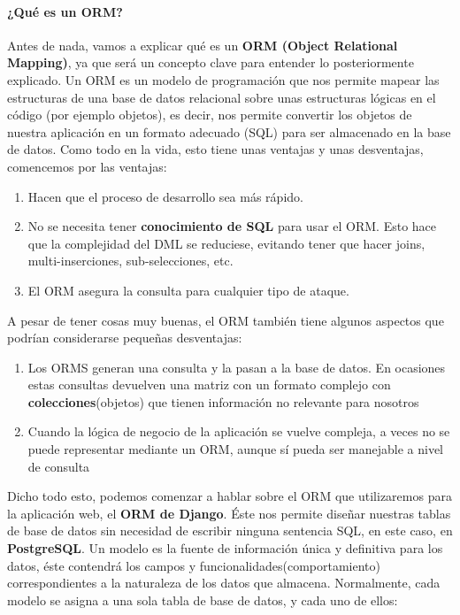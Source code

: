    \paragraph{¿Qué es un ORM?} \underline{}                                            
    \newline Antes de nada, vamos a explicar qué es un \textbf{ORM (Object Relational Mapping)}, ya
    que será un concepto clave para entender lo posteriormente explicado. Un ORM es un modelo
    de programación que nos permite mapear las estructuras de una base de datos relacional
    sobre unas estructuras lógicas en el código (por ejemplo objetos), es decir, nos permite
    convertir los objetos de nuestra aplicación en un formato adecuado (SQL) para ser
    almacenado en la base de datos. Como todo en la vida, esto tiene unas ventajas y unas
    desventajas, comencemos por las ventajas:

        \begin{enumerate}
            \item Hacen que el proceso de desarrollo sea más rápido.
            \item No se necesita tener \textbf{conocimiento de SQL } para usar el ORM. Esto
            hace que la complejidad del DML se reduciese, evitando tener que hacer joins,
            multi-inserciones, sub-selecciones, etc.
            \item El ORM asegura la consulta para cualquier tipo de ataque.
        \end{enumerate}

    A pesar de tener cosas muy buenas, el ORM también tiene algunos aspectos que podrían
    considerarse pequeñas desventajas:

        \begin{enumerate}
            \item Los ORMS generan una consulta y la pasan a la base de datos. En ocasiones
            estas consultas devuelven una matriz con un formato complejo con
            \textbf{colecciones}(objetos) que tienen información no relevante para nosotros
            \item Cuando la lógica de negocio de la aplicación se vuelve compleja, a veces
            no se puede representar mediante un ORM, aunque sí pueda ser manejable a nivel
            de consulta
        \end{enumerate}

    Dicho todo esto, podemos comenzar a hablar sobre el ORM que utilizaremos para la
    aplicación web, el \textbf{ORM de Django}. Éste nos permite diseñar nuestras tablas de 
    base de datos sin necesidad de escribir ninguna sentencia SQL, en este caso, en
    \textbf{PostgreSQL}. Un modelo es la fuente de información única y definitiva para los
    datos, éste contendrá los campos y funcionalidades(comportamiento) correspondientes a
    la naturaleza de los datos que almacena. Normalmente, cada modelo se asigna a una sola
    tabla de base de datos, y cada uno de ellos:

